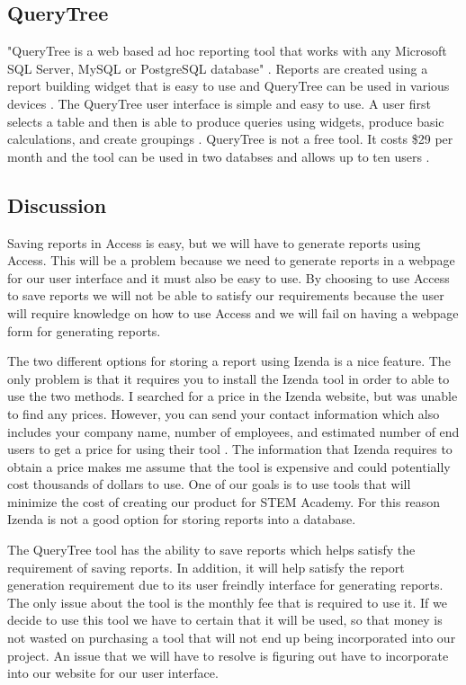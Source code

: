 \documentclass[letterpaper,10pt,serif, draftclsnofoot,onecolumn, compsoc, titlepage]{IEEEtran}
\begin{document}
\subsection{QueryTree}
"QueryTree is a web based ad hoc reporting tool that works with any Microsoft SQL Server, MySQL or PostgreSQL database" \cite{QueryTree}. Reports are created using a report building widget that is easy to use and QueryTree can be used in various devices \cite{QueryTree}. The QueryTree user interface is simple and easy to use. A user first selects a table and then is able to produce queries using widgets, produce basic calculations, and create groupings \cite{QueryTree}. QueryTree is not a free tool. It costs \$29 per month and the tool can be used in two databses and allows up to ten users \cite{QueryTree}. 

\subsection{Discussion}
Saving reports in Access is easy, but we will have to generate reports using Access. This will be a problem because we need to generate reports in a webpage for our user interface and it must also be easy to use. By choosing to use Access to save reports we will not be able to satisfy our requirements because the user will require knowledge on how to use Access and we will fail on having a webpage form for generating reports. 

The two different options for storing a report using Izenda is a nice feature. The only problem is that it requires you to install the Izenda tool in order to able to use the two methods. I searched for a price in the Izenda website, but was unable to find any prices. However, you can send your contact information which also includes your company name, number of employees, and estimated number of end users to get a price for using their tool \cite{CostIzenda}. The information that Izenda requires to obtain a price makes me assume that the tool is expensive and could potentially cost thousands of dollars to use. One of our goals is to use tools that will minimize the cost of creating our product for STEM Academy. For this reason Izenda is not a good option for storing reports into a database. 

The QueryTree tool has the ability to save reports which helps satisfy the requirement of saving reports. In addition, it will help satisfy the report generation requirement due to its user freindly interface for generating reports. The only issue about the tool is the monthly fee that is required to use it. If we decide to use this tool we have to certain that it will be used, so that money is not wasted on purchasing a tool that will not end up being incorporated into our project. An issue that we will have to resolve is figuring out have to incorporate into our website for our user interface. 
\end{document}
